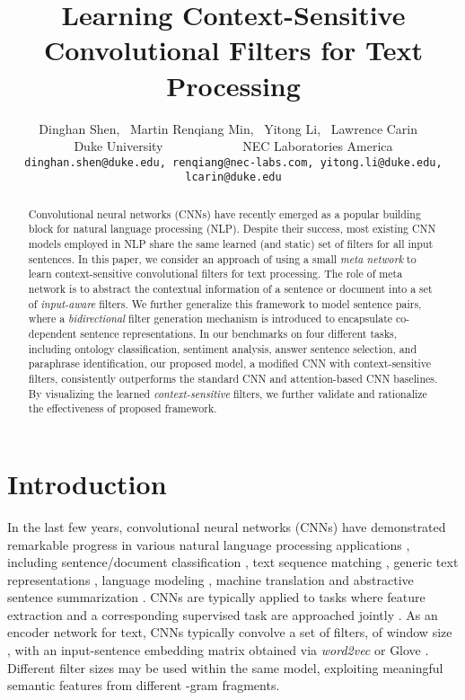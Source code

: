 \documentclass[11pt,a4paper]{article}
\title{Learning Context-Sensitive Convolutional Filters for Text Processing}
\author{Dinghan Shen, ~Martin Renqiang Min, ~Yitong Li, ~Lawrence Carin
	\smallskip
	~  \\
	\smallskip 
	 Duke University~~~~~~~~~~~~ 
	 NEC Laboratories America \\
{\small \tt dinghan.shen@duke.edu, renqiang@nec-labs.com, yitong.li@duke.edu, 
		lcarin@duke.edu} 
	}
\date{}
\begin{document}
\maketitle
\begin{abstract}
Convolutional neural networks (CNNs) have recently emerged as a popular building block for natural language processing (NLP). Despite their success, most existing CNN models employed in NLP share the  same learned (and static) set of filters for all input sentences. In this paper, we consider an approach of using a small \emph{meta network} to learn context-sensitive convolutional filters for text processing. The role of meta network is to abstract the contextual information of a sentence or document into a set of \emph{input-aware} filters. We further generalize this framework to model sentence pairs, where a \emph{bidirectional} filter generation mechanism is introduced to encapsulate co-dependent sentence representations.  In our benchmarks on four different tasks,  including ontology classification, sentiment analysis, answer sentence selection, and paraphrase identification, our proposed model, a modified CNN with context-sensitive filters, consistently outperforms the standard CNN and attention-based CNN baselines. By visualizing the learned \emph{context-sensitive} filters, we further validate and rationalize the effectiveness of proposed framework.





\end{abstract}

\section{Introduction}

In the last few years, convolutional neural networks (CNNs) have demonstrated remarkable progress in various natural language processing applications \cite{collobert2011natural}, including sentence/document classification \citep{kim2014convolutional,zhang2015character, wang2018joint}, text sequence matching \citep{hu2014convolutional,yin2015abcnn, shen2017deconvolutional}, generic text representations \citep{gan2016learning, tang2018speeding}, language modeling \citep{dauphin2016language}, machine translation \citep{gehring2017convolutional} and abstractive sentence summarization \citep{gehring2017convolutional}. 
CNNs are typically applied to tasks where feature extraction and a corresponding supervised task are approached jointly \citep{lecun1998gradient}. 
As an encoder network for text, CNNs typically convolve a set of filters, of window size , with an input-sentence embedding matrix obtained via \emph{word2vec} \citep{mikolov2013distributed} or Glove \citep{pennington2014glove}.
Different filter sizes  may be used within the same model, exploiting meaningful semantic features from different -gram fragments. 
\end{document}
